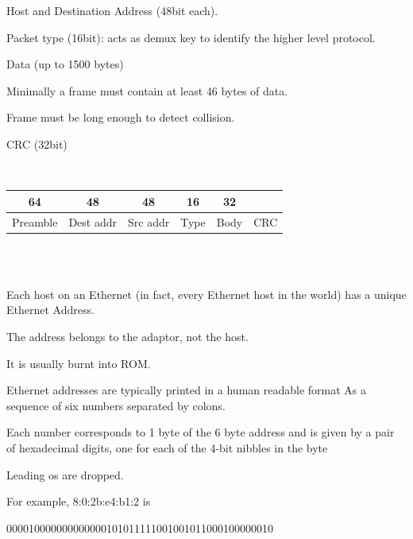 \begin{description}
\bi
 \ite Host and Destination Address (48bit each).
 \ei

\bi
 \ite Packet type (16bit): acts as demux key to identify the higher level protocol.
 \ei

\bi
 \ite Data (up to 1500 bytes)
 \ei


\bi
  \ite Minimally a frame must contain at least 46 bytes of data.

  \ite Frame must be long enough to detect collision.

\ei
\bi
 \ite CRC (32bit)
 \ei



\os{\newpage}\item[{\rot\bf  Ethernet Frame }]~\\[-3ex]

\begin{center}
\begin{tabular}{|c|c|c|c|c|c|}
64 & 48 & 48 & 16 & 32 &  \\
\hline
Preamble & Dest addr & Src addr & Type & Body & CRC \\
\hline
\end{tabular}
\end{center}


\os{\newpage}\item[{\rot\bf  Ethernet Frame Format }]~\\[-3ex]


\os{\newpage}\item[{\rot\bf  Ethernet Addresses }]~\\[-3ex]

\bi
  \ite Each host on an Ethernet (in fact, every Ethernet host in the world) has a unique Ethernet Address.

  \ite The address belongs to the adaptor, not the host.

\ei
\bi
 \ite It is usually burnt into ROM.
 \ei


\bi
  \ite Ethernet addresses are typically printed in a human readable format
\ei
\bi
 \ite As a sequence of six numbers separated by colons.
 \ei

\bi
 \ite Each number corresponds to 1 byte of the 6 byte address and is given by a pair of hexadecimal digits, one for each of the 4-bit nibbles in the byte
 \ei

\bi
 \ite Leading os are dropped.
 \ei

\bi
 \ite For example, 8:0:2b:e4:b1:2 is
 \ei


\textbullet{} 000010000000000000101011111001001011000100000010



\end{description}
